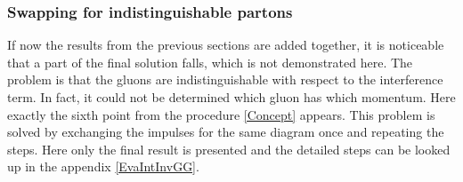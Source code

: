 \pagebreak

\subsubsection{Swapping for indistinguishable partons}

If now the results from the previous sections are added together, it is noticeable that a part of the final solution falls, which is not demonstrated here. The problem is that the gluons are indistinguishable with respect to the interference term. In fact, it could not be determined which gluon has which momentum. Here exactly the sixth point from the procedure \ref{Concept} appears. This problem is solved by exchanging the impulses for the same diagram once and repeating the steps. Here only the final result is presented and the detailed steps can be looked up in the appendix \ref{EvaIntInvGG}.


